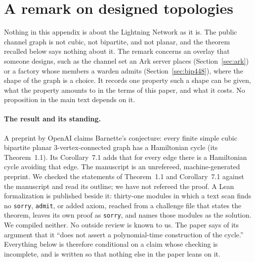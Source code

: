 \section{A remark on designed topologies}
\label{app:topology}

Nothing in this appendix is about the Lightning Network as it is. The public channel graph is not cubic, not bipartite, and not planar, and the theorem recalled below says nothing about it. The remark concerns an overlay that someone designs, such as the channel set an Ark server places (Section~\ref{sec:ark}) or a factory whose members a warden admits (Section~\ref{sec:bip448}), where the shape of the graph is a choice. It records one property such a shape can be given, what the property amounts to in the terms of this paper, and what it costs. No proposition in the main text depends on it.

\paragraph{The result and its standing.} A preprint by OpenAI \citep{openai2026barnette} claims Barnette's conjecture: every finite simple cubic bipartite planar 3-vertex-connected graph has a Hamiltonian cycle (its Theorem~1.1). Its Corollary~7.1 adds that for every edge there is a Hamiltonian cycle avoiding that edge. The manuscript is an unrefereed, machine-generated preprint. We checked the statements of Theorem~1.1 and Corollary~7.1 against the manuscript and read its outline; we have not refereed the proof. A Lean formalization is published beside it: thirty-one modules in which a text scan finds no \texttt{sorry}, \texttt{admit}, or added axiom, reached from a challenge file that states the theorem, leaves its own proof as \texttt{sorry}, and names those modules as the solution. We compiled neither. No outside review is known to us. The paper says of its argument that it ``does not assert a polynomial-time construction of the cycle.'' Everything below is therefore conditional on a claim whose checking is incomplete, and is written so that nothing else in the paper leans on it.

